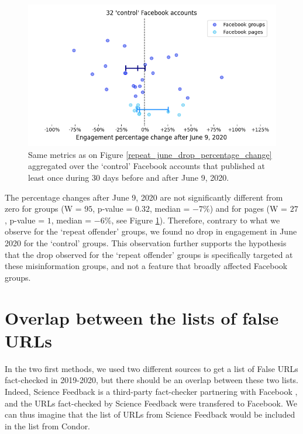 \documentclass[review]{elsarticle}
\begin{document}
{\begin{figure}[!h]
\centering
\includegraphics[scale=0.5]{./../figure/supplementary_mainstream_june_drop_percentage_change.png}
\caption{
Same metrics as on Figure \ref{repeat_june_drop_percentage_change} aggregated over the `control' Facebook accounts that published at least once during 30 days before and after June 9, 2020.
}
\label{june_drop_control}
\end{figure}

The percentage changes after June 9, 2020 are not significantly different from zero for groups (W = $95$, p-value = $0.32$, median = $-7\%$) and for pages (W = $27$, p-value = $1$, median = $-6\%$, see Figure \ref{june_drop_control}).
Therefore, contrary to what we observe for the `repeat offender' groups, we found no drop in engagement in June 2020 for the `control' groups.
This observation further supports the hypothesis that the drop observed for the `repeat offender' groups is specifically targeted at these misinformation groups, and not a feature that broadly affected Facebook groups.

\section*{Overlap between the lists of false URLs}

In the two first methods, we used two different sources to get a list of False URLs fact-checked in 2019-2020, but there should be an overlap between these two lists. 
Indeed, Science Feedback is a third-party fact-checker partnering with Facebook \citep{sciencefeedbackFbPartner}, and the URLs fact-checked by Science Feedback were transfered to Facebook.
We can thus imagine that the list of URLs from Science Feedback would be included in the list from Condor.

}
\end{document}
